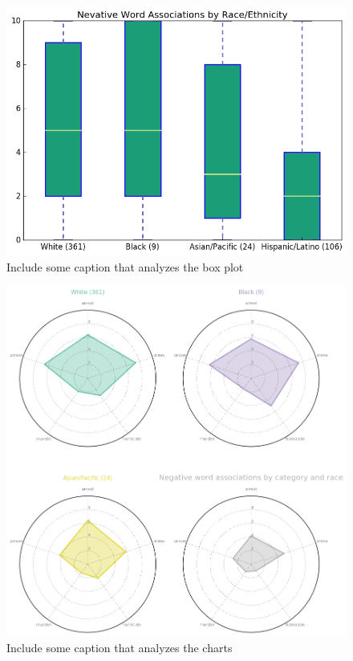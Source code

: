 \documentclass[sigconf]{acmart}
\begin{document}
\begin{figure}
\includegraphics[width=\columnwidth]{images/fig2.png}
\caption{Include some caption that analyzes the box plot}
\label{Figure 2}
\end{figure}

\begin{figure}
\includegraphics[width=\columnwidth]{images/fig3.png}
\caption{Include some caption that analyzes the charts}
\label{Figure 3}
\end{figure}
\end{document}

